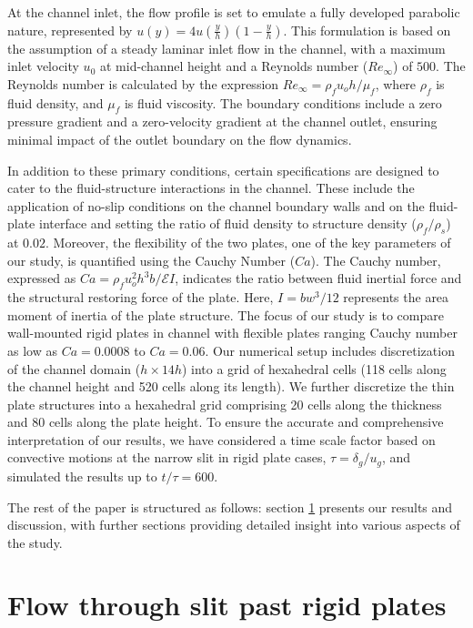 \documentclass[final,3p,times,authoryear]{elsarticle}
\begin{document}
At the channel inlet, the flow profile is set to emulate a fully developed parabolic nature, represented by $u(y)=4u\left(\frac{y}{h}\right)\left(1-\frac{y}{h}\right)$. This formulation is based on the assumption of a steady laminar inlet flow in the channel, with a maximum inlet velocity $u_0$ at mid-channel height and a Reynolds number ($Re_\infty$) of $500$. The Reynolds number is calculated by the expression $Re_\infty={\rho_fu_o h}/\mu_f$, where $\rho_f$ is fluid density, and $\mu_f$ is fluid viscosity. The boundary conditions include a zero pressure gradient and a zero-velocity gradient at the channel outlet, ensuring minimal impact of the outlet boundary on the flow dynamics.

In addition to these primary conditions, certain specifications are designed to cater to the fluid-structure interactions in the channel. These include the application of no-slip conditions on the channel boundary walls and on the fluid-plate interface and setting the ratio of fluid density to structure density ($\rho_f / \rho_s$) at $0.02$. Moreover, the flexibility of the two plates, one of the key parameters of our study, is quantified using the Cauchy Number ($Ca$). The Cauchy number, expressed as $Ca=\rho_f u_o^2 h^3 b/{\mathcal{E}I} $, indicates the ratio between fluid inertial force and the structural restoring force of the plate. Here, $I=bw^3/12$ represents the area moment of inertia of the plate structure. The focus of our study is to compare wall-mounted rigid plates in channel with flexible plates ranging Cauchy number as low as $Ca=0.0008$ to $Ca = 0.06$. Our numerical setup includes discretization of the channel domain ($h\times14h$) into a grid of hexahedral cells (118 cells along the channel height and 520 cells along its length). We further discretize the thin plate structures into a hexahedral grid comprising 20 cells along the thickness and 80 cells along the plate height. To ensure the accurate and comprehensive interpretation of our results, we have considered a time scale factor based on convective motions at the narrow slit in rigid plate cases, $\tau={\delta_g/u_g}$, and simulated the results up to $t/\tau=600$.

The rest of the paper is structured as follows: section \ref{sec:Results} presents our results and discussion, with further sections providing detailed insight into various aspects of the study.

\section{Flow through slit past rigid plates}\label{sec:Results}
\end{document}
